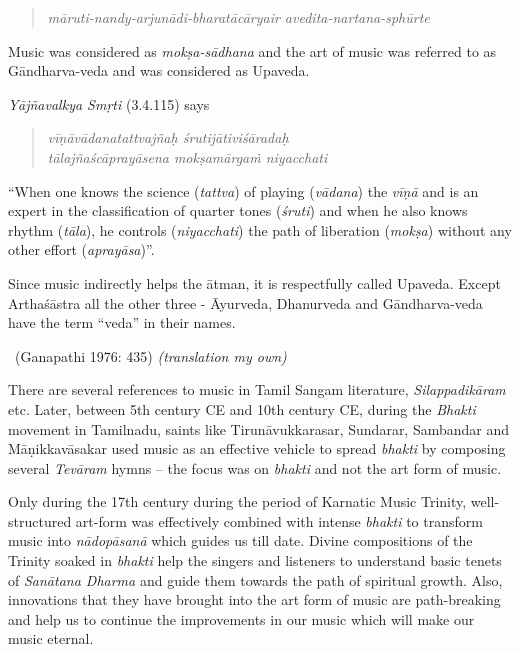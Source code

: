 \begin{verse}
\textit{māruti-nandy-arjunādi-bharatācāryair avedita-nartana-sphūrte}
\end{verse}

Music was considered as \textit{mokṣa-sādhana} and the art of music was referred to as Gāndharva-veda and was considered as Upaveda.

\textit{Yājñavalkya Smṛti} (3.4.115) says

\begin{verse}
\textit{vīṇāvādanatattvajñaḥ śrutijātiviśāradaḥ} \\\textit{tālajñaścāprayāsena mokṣamārgaṁ niyacchati} 
\end{verse}

“When one knows the science (\textit{tattva}) of playing (\textit{vādana}) the \textit{vīṇā} and is an expert in the classification of quarter tones (\textit{śruti}) and when he also knows rhythm (\textit{tāla}), he controls (\textit{niyacchati}) the path of liberation (\textit{mokṣa}) without any other effort (\textit{aprayāsa})”.

\begin{myquote}
Since music indirectly helps the ātman, it is respectfully called Upaveda. Except Arthaśāstra all the other three - Āyurveda, Dhanurveda and Gāndharva-veda have the term “veda” in their names. 

~\hfill (Ganapathi 1976: 435) \textit{(translation my own)}
\end{myquote}

There are several references to music in Tamil Sangam literature, \textit{Silappadikāram} etc. Later, between 5th century CE and 10th century CE, during the \textit{Bhakti} movement in Tamilnadu, saints like Tirunāvukkarasar, Sundarar, Sambandar and Māṇikkavāsakar used music as an effective vehicle to spread \textit{bhakti} by composing several \textit{Tevāram} hymns – the focus was on \textit{bhakti} and not the art form of music.

Only during the 17th century during the period of Karnatic Music Trinity, well-structured art-form was effectively combined with intense \textit{bhakti} to transform music into \textit{nādopāsanā} which guides us till date. Divine compositions of the Trinity soaked in \textit{bhakti} help the singers and listeners to understand basic tenets of \textit{Sanātana Dharma} and guide them towards the path of spiritual growth. Also, innovations that they have brought into the art form of music are path-breaking and help us to continue the improvements in our music which will make our music eternal.

